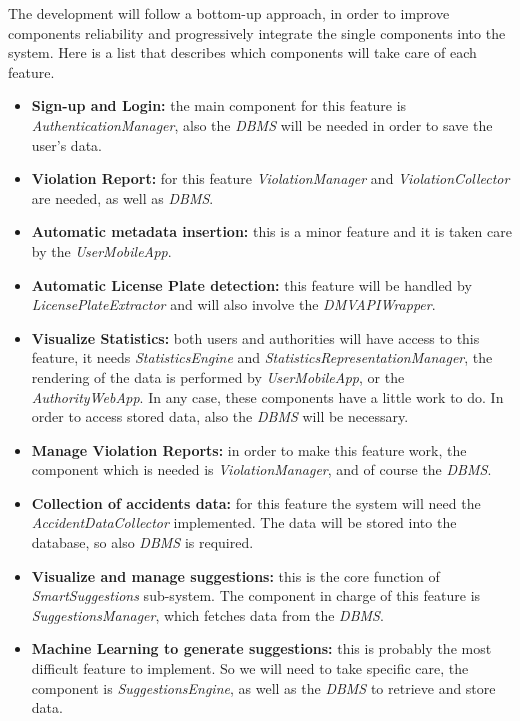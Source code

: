 The development will follow a bottom-up approach, in order to improve components
reliability and progressively integrate the single components into the system.
Here is a list that describes which components will take care of each feature.
\begin{itemize}
    \item \textbf{Sign-up and Login:} the main component for this feature is
        \emph{AuthenticationManager}, also the \emph{DBMS} will be needed in
        order to save the user's data.
    \item \textbf{Violation Report:} for this feature \emph{ViolationManager} 
        and \emph{ViolationCollector} are needed, as well as \emph{DBMS}.
    \item \textbf{Automatic metadata insertion:} this is a minor feature and it
        is taken care by the \emph{UserMobileApp}.
    \item \textbf{Automatic License Plate detection:} this feature will be
        handled by \emph{LicensePlateExtractor} and will also involve the
        \emph{DMVAPIWrapper}.
    \item \textbf{Visualize Statistics:} both users and authorities will have
        access to this feature, it needs \emph{StatisticsEngine} and
        \emph{StatisticsRepresentationManager}, the rendering of the data is
        performed by \emph{UserMobileApp}, or the \emph{AuthorityWebApp}. In any
        case, these components have a little work to do. In order to access
        stored data, also the \emph{DBMS} will be necessary.
    \item \textbf{Manage Violation Reports:} in order to make this feature work,
        the component which is needed is \emph{ViolationManager}, and of course
        the \emph{DBMS}.
    \item \textbf{Collection of accidents data:} for this feature the system
        will need the \emph{AccidentDataCollector} implemented. The data will be
        stored into the database, so also \emph{DBMS} is required.
    \item \textbf{Visualize and manage suggestions:} this is the core function
        of \emph{SmartSuggestions} sub-system. The component in charge of this
        feature is \emph{SuggestionsManager}, which fetches data from the
        \emph{DBMS}.
    \item \textbf{Machine Learning to generate suggestions:} this is probably
        the most difficult feature to implement. So we will need to take
        specific care, the component is \emph{SuggestionsEngine}, as well as the
        \emph{DBMS} to retrieve and store data.
\end{itemize}